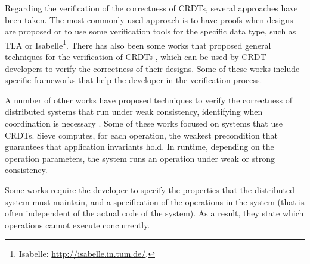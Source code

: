 \documentclass[11pt,a4paper]{article}
\begin{document}
Regarding the verification of the correctness of CRDTs, several approaches have been 
taken. The most commonly used approach is to have proofs when designs are proposed
or to use some verification tools for the specific data type, such as 
TLA \cite{Lamport94TLA} or Isabelle\footnote{Isabelle: \url{http://isabelle.in.tum.de/}.}.
There has also been some works that proposed general techniques 
for the verification of CRDTs \cite{Burckhardt14Replicated,Zeller14Formal,Gomes17Verifying}, 
which can be used by CRDT developers to verify the correctness of their designs.
Some of these works \cite{Zeller14Formal,Gomes17Verifying} 
include specific frameworks that help the developer 
in the verification process.

A number of other works have proposed techniques to verify the correctness
of distributed systems that run under weak consistency, identifying when
coordination is necessary 
\cite{Li14Automating,Balegas15Putting,Homeostasis,Gotsman16Cause,Zeller17Testing,blazes}.
Some of these works focused on systems that use CRDTs.
Sieve \cite{Li14Automating} computes, for each operation, the weakest precondition 
that guarantees that application invariants hold. 
In runtime, depending on the operation parameters, the system runs an operation under
weak or strong consistency.

Some works \cite{Balegas15Putting,Gotsman16Cause,Zeller17Testing} require the developer 
to specify the properties that the distributed system must maintain, and a 
specification of the operations in the system (that is often independent 
of the actual code of the system). 
As a result, they state which operations cannot execute concurrently.

\end{document}
